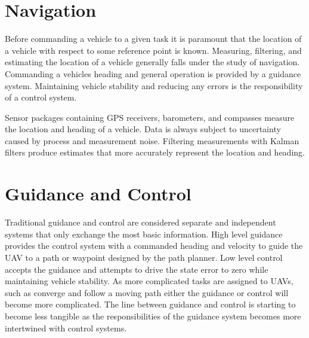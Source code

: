 \documentclass[numbered,pdftex]{ohio-etd}
\begin{document}
\section{Navigation}
Before commanding a vehicle to a given task it is paramount that the location of a vehicle with respect to some reference point is known. Measuring, filtering, and estimating the location of a vehicle generally falls under the study of navigation. Commanding a vehicles heading and general operation is provided by a guidance system. Maintaining vehicle stability and reducing any errors is the responsibility of a control system. 

Sensor packages containing GPS receivers, barometers, and compasses measure the location and heading of a vehicle. Data is always subject to uncertainty caused by process and measurement noise. Filtering measurements with Kalman filters produce estimates that more accurately represent the location and heading.



\section{Guidance and Control}

%
%
%
Traditional guidance and control are considered separate and independent systems that only exchange the most basic information. High level guidance provides the control system with a commanded heading and velocity to guide the UAV to a path or waypoint designed by the path planner. Low level control accepts the guidance and attempts to drive the state error to zero while maintaining vehicle stability. As more complicated tasks are assigned to UAVs, such as converge and follow a moving path \cite{oliveira_moving_2016} either the guidance or control will become more complicated. The line between guidance and control is starting to become less tangible as the responsibilities of the guidance system becomes more intertwined with control systems. 
\end{document}
